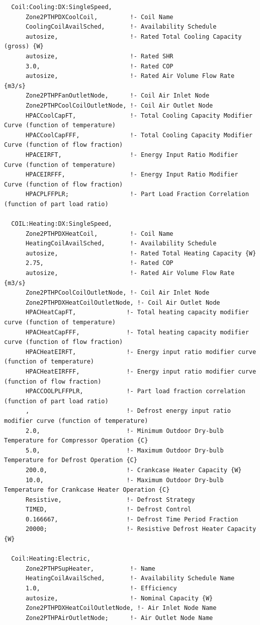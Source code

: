 \begin{lstlisting}
  Coil:Cooling:DX:SingleSpeed,
      Zone2PTHPDXCoolCoil,         !- Coil Name
      CoolingCoilAvailSched,       !- Availability Schedule
      autosize,                    !- Rated Total Cooling Capacity (gross) {W}
      autosize,                    !- Rated SHR
      3.0,                         !- Rated COP
      autosize,                    !- Rated Air Volume Flow Rate {m3/s}
      Zone2PTHPFanOutletNode,      !- Coil Air Inlet Node
      Zone2PTHPCoolCoilOutletNode, !- Coil Air Outlet Node
      HPACCoolCapFT,               !- Total Cooling Capacity Modifier Curve (function of temperature)
      HPACCoolCapFFF,              !- Total Cooling Capacity Modifier Curve (function of flow fraction)
      HPACEIRFT,                   !- Energy Input Ratio Modifier Curve (function of temperature)
      HPACEIRFFF,                  !- Energy Input Ratio Modifier Curve (function of flow fraction)
      HPACPLFFPLR;                 !- Part Load Fraction Correlation (function of part load ratio)

  COIL:Heating:DX:SingleSpeed,
      Zone2PTHPDXHeatCoil,         !- Coil Name
      HeatingCoilAvailSched,       !- Availability Schedule
      autosize,                    !- Rated Total Heating Capacity {W}
      2.75,                        !- Rated COP
      autosize,                    !- Rated Air Volume Flow Rate {m3/s}
      Zone2PTHPCoolCoilOutletNode, !- Coil Air Inlet Node
      Zone2PTHPDXHeatCoilOutletNode, !- Coil Air Outlet Node
      HPACHeatCapFT,              !- Total heating capacity modifier curve (function of temperature)
      HPACHeatCapFFF,             !- Total heating capacity modifier curve (function of flow fraction)
      HPACHeatEIRFT,              !- Energy input ratio modifier curve (function of temperature)
      HPACHeatEIRFFF,             !- Energy input ratio modifier curve (function of flow fraction)
      HPACCOOLPLFFPLR,            !- Part load fraction correlation (function of part load ratio)
      ,                           !- Defrost energy input ratio modifier curve (function of temperature)
      2.0,                        !- Minimum Outdoor Dry-bulb Temperature for Compressor Operation {C}
      5.0,                        !- Maximum Outdoor Dry-bulb Temperature for Defrost Operation {C}
      200.0,                      !- Crankcase Heater Capacity {W}
      10.0,                       !- Maximum Outdoor Dry-bulb Temperature for Crankcase Heater Operation {C}
      Resistive,                  !- Defrost Strategy
      TIMED,                      !- Defrost Control
      0.166667,                   !- Defrost Time Period Fraction
      20000;                      !- Resistive Defrost Heater Capacity {W}

  Coil:Heating:Electric,
      Zone2PTHPSupHeater,          !- Name
      HeatingCoilAvailSched,       !- Availability Schedule Name
      1.0,                         !- Efficiency
      autosize,                    !- Nominal Capacity {W}
      Zone2PTHPDXHeatCoilOutletNode, !- Air Inlet Node Name
      Zone2PTHPAirOutletNode;      !- Air Outlet Node Name
\end{lstlisting}


